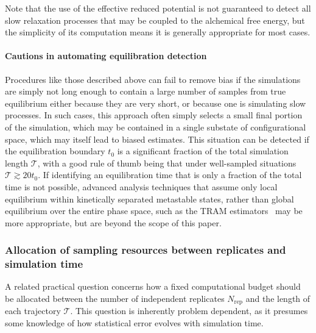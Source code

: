 Note that the use of the effective reduced potential is not guaranteed to detect all slow relaxation processes that may be coupled to the alchemical free energy, but the simplicity of its computation means it is generally appropriate for most cases.

\paragraph{Cautions in automating equilibration detection}

Procedures like those described above can fail to remove bias if the simulations are simply not long enough to contain a large number of samples from true equilibrium either because they are very short, or because one is simulating slow processes. In such cases, this approach often simply selects a small final portion of the simulation, which may be contained in a single substate of configurational space, which may itself lead to biased estimates. 
This situation can be detected if the equilibration boundary $t_0$ is a significant fraction of the total simulation length $\mathcal{T}$, with a good rule of thumb being that under well-sampled situations $\mathcal{T} \gtrsim 20 t_0$.
If identifying an equilibration time that is only a fraction of the total time is not possible, advanced analysis techniques that assume only local equilibrium within kinetically separated metastable states, rather than global equilibrium over the entire phase space, such as the TRAM estimators~\cite{mey2014xtram,wu2016multiensemble,nuske2017markov} may be more appropriate, but are beyond the scope of this paper.

\subsubsection{Allocation of sampling resources between replicates and simulation time}

A related practical question concerns how a fixed computational budget should be allocated between the number of independent replicates $N_{\mathrm{rep}}$ and the length of each trajectory $\mathcal{T}$. This question is inherently problem dependent, as it presumes some knowledge of how statistical error evolves with simulation time. 

